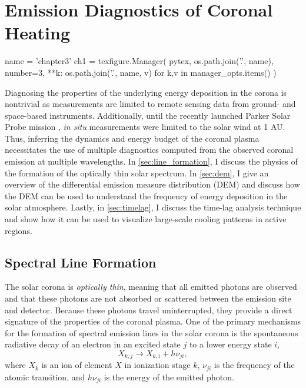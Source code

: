 \chapter{Emission Diagnostics of Coronal Heating}\label{ch:diagnostics}

\begin{pycode}[chapter_3]
name = 'chapter3'
ch1 = texfigure.Manager(
    pytex,
    os.path.join('.', name),
    number=3,
    **{k: os.path.join('.', name, v) for k,v in manager_opts.items()}
)
\end{pycode}

Diagnosing the properties of the underlying energy deposition in the corona is nontrivial as measurements are limited to remote sensing data from ground- and space-based instruments. Additionally, until the recently launched Parker Solar Probe mission \citep{fox_solar_2016}, \textit{in situ} measurements were limited to the solar wind at 1 AU. Thus, inferring the dynamics and energy budget of the coronal plasma necessitates the use of multiple diagnostics computed from the observed coronal emission at multiple wavelengths. In \autoref{sec:line_formation}, I discuss the physics of the formation of the optically thin solar spectrum. In \autoref{sec:dem}, I give an overview of the differential emission measure distribution (DEM) and discuss how the DEM can be used to understand the frequency of energy deposition in the solar atmosphere. Lastly, in \autoref{sec:timelag}, I discuss the time-lag analysis technique and show how it can be used to visualize large-scale cooling patterns in active regions.


\section{Spectral Line Formation}\label{sec:line_formation}

The solar corona is \textit{optically thin}, meaning that all emitted photons are observed and that these photons are not absorbed or scattered between the emission site and detector. Because these photons travel uninterrupted, they provide a direct signature of the properties of the coronal plasma. One of the primary mechanisms for the formation of spectral emission lines in the solar corona is the spontaneous radiative decay of an electron in an excited state $j$ to a lower energy state $i$,
\begin{equation}\label{eq:radiative_decay}
    X_{k,j} \to X_{k,i} + h\nu_{ji},
\end{equation}
where $X_k$ is an ion of element $X$ in ionization stage $k$, $\nu_{ji}$ is the frequency of the atomic transition, and $h\nu_{ji}$ is the energy of the emitted photon.

